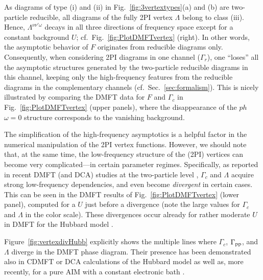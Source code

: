 \documentclass[rmp,aps,reprint,amsmath,amssymb,superscriptaddress,showpacs,nofootinbib]{revtex4-1}
\begin{document}
As diagrams of type (i) and (ii) in Fig.~\ref{fig:3vertextypes}(a) and (b) are two-particle reducible, all diagrams of the fully 2PI vertex $\Lambda$ belong to  class (iii). Hence,  $\Lambda^{\nu\nu'\omega}$ decays in all three directions of frequency space except for a constant background $U$; cf.\ Fig.~\ref{fig:PlotDMFTvertex} (right). In other words, the asymptotic behavior of $F$ originates from reducible diagrams only. Consequently, when considering 2PI diagrams in one channel ($\Gamma_r$), one ``loses'' all the asymptotic structures generated by the two-particle reducible  diagrams in this channel, keeping only the high-frequency features  from the reducible diagrams in the complementary channels (cf.\ Sec.~\ref{sec:formalism}). This is nicely illustrated by comparing the DMFT data for $F$ and $\Gamma_c$ in Fig.~\ref{fig:PlotDMFTvertex} (upper panels), where the disappearance of the $ph$  $\omega=0$ structure   corresponds to the vanishing background.

The simplification of the high-frequency asymptotics is a helpful factor in the numerical manipulation of the 2PI vertex functions. However, we should note that, at the same time, the low-frequency structure of the (2PI) vertices can become very complicated---in certain parameter regimes. Specifically, as reported in recent DMFT (and DCA) studies at the two-particle level \cite{Schafer2013, Janis2014,Gunnarsson2016,Schaefer2016c,Ribic2016}, $\Gamma_c$ and $\Lambda$ acquire strong low-frequency dependencies, and even become {\sl divergent} in certain cases.  This can be seen in the DMFT results of Fig.~\ref{fig:PlotDMFTvertex} (lower panel), computed for a  $U$  just before a divergence (note the  large values for $\Gamma_c$ and $\Lambda$  in the color scale). These divergences occur already for rather moderate $U$ in  DMFT  for the Hubbard model \cite{Schafer2013,Gunnarsson2016,Schaefer2016c}.

Figure~\ref{fig:vertexdivHubb} explicitly shows the multiple lines where $\Gamma_c$, $\Gamma_{\rm pp}$, and $\Lambda$ diverge in the DMFT phase diagram. Their presence has been demonstrated also in CDMFT or DCA calculations of the Hubbard model \cite{Gunnarsson2016,Vucicevic2018} as well as, more recently, for a pure AIM with a constant electronic bath \cite{Chalupa2017}.    
 
\end{document}
